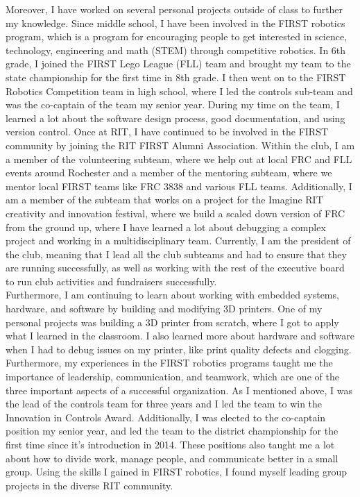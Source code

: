 \documentclass[line,margin]{res}
\begin{document}
\begin{resume}
\begin{adjustwidth}{-92pt}{0pt}
\noindent
Moreover, I have worked on several personal projects outside of class to further my knowledge. Since middle school, I have been involved in the FIRST robotics program, which is a program for encouraging people to get interested in science, technology, engineering and math (STEM) through competitive robotics. In 6th grade, I joined the FIRST Lego League (FLL) team and brought my team to the state championship for the first time in 8th grade. I then went on to the FIRST Robotics Competition team in high school, where I led the controls sub-team and was the co-captain of the team my senior year. During my time on the team, I learned a lot about the software design process, good documentation, and using version control. Once at RIT, I have continued to be involved in the FIRST community by joining the RIT FIRST Alumni Association. Within the club, I am a member of the volunteering subteam, where we help out at local FRC and FLL events around Rochester and a member of the mentoring subteam, where we mentor local FIRST teams like FRC 3838 and various FLL teams. Additionally, I am a member of the subteam that works on a project for the Imagine RIT creativity and innovation festival, where we build a scaled down version of FRC from the ground up, where I have learned a lot about debugging a complex project and working in a multidisciplinary team. Currently, I am the president of the club, meaning that I lead all the club subteams and had to ensure that they are running successfully, as well as working with the rest of the executive board to run club activities and fundraisers successfully. \\

\noindent
Furthermore, I am continuing to learn about working with embedded systems, hardware, and software by building and modifying 3D printers. One of my personal projects was building a 3D printer from scratch, where I got to apply what I learned in the classroom. I also learned more about hardware and software when I had to debug issues on my printer, like print quality defects and clogging. \\

\noindent
Furthermore, my experiences in the FIRST robotics programs taught me the importance of leadership, communication, and teamwork, which are one of the three important aspects of a successful organization. As I mentioned above, I was the lead of the controls team for three years and I led the team to win the Innovation in Controls Award. Additionally, I was elected to the co-captain position my senior year, and led the team to the district championship for the first time since it's introduction in 2014. These positions also taught me a lot about how to divide work, manage people, and communicate better in a small group. Using the skills I gained in FIRST robotics, I found myself leading group projects in the diverse RIT community. \\


\end{adjustwidth}
\end{resume}
\end{document}
